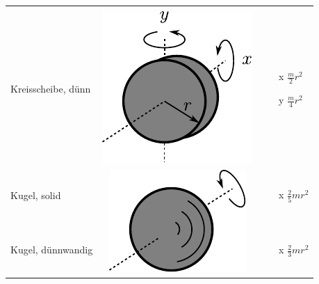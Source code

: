 \begin{table}[h!]
\begin{tabular}{m{2cm} c m{}}
\begin{itemize}
		\end{itemize} \\
Kreisscheibe, dünn &
	\begin{minipage}{0.3\textwidth}
	\centering
	\includegraphics[scale=\traegscale]{traeg-kreisscheibe-duenn.pdf}
	\end{minipage} &
		\begin{itemize}
		\item[x] $\frac{m}{2} r^2$
		\item[y] $\frac{m}{4} r^2$
		\end{itemize} \\
Kugel, solid & \multirow{2}{*}{
	\begin{minipage}{0.3\textwidth}
	\centering
	\includegraphics[scale=\traegscale]{traeg-kugel.pdf}
	\end{minipage}}
		&
		\begin{itemize}
			\item[x] $\frac{2}{5} mr^2$
		\end{itemize} \\
Kugel, dünnwandig & &
		\begin{itemize}
			\item[x] $\frac{2}{3} mr^2$
		\end{itemize}
\end{tabular}
\end{table}

